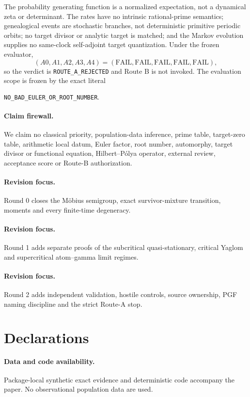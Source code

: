 \documentclass[9pt]{extarticle}
\begin{document}
The probability generating function is a normalized expectation, not a
dynamical zeta or determinant.  The rates have no intrinsic rational-prime
semantics; genealogical events are stochastic branches, not deterministic
primitive periodic orbits; no target divisor or analytic target is matched;
and the Markov evolution supplies no same-clock self-adjoint target
quantization.  Under the frozen evaluator,
\[
 (A0,A1,A2,A3,A4)=(\mathrm{FAIL},\mathrm{FAIL},\mathrm{FAIL},
 \mathrm{FAIL},\mathrm{FAIL}),
\]
so the verdict is \texttt{ROUTE\_A\_REJECTED} and Route B is not invoked.
The evaluation scope is frozen by the exact literal
\begin{center}
\texttt{NO\_BAD\_EULER\_OR\_ROOT\_NUMBER}.
\end{center}

\paragraph{Claim firewall.}
We claim no classical priority, population-data inference, prime table,
target-zero table, arithmetic local datum, Euler factor, root number,
automorphy, target divisor or functional equation, Hilbert--P\'olya operator,
external review, acceptance score or Route-B authorization.
\fi

\ifcase\CRevisionRound
\paragraph{Revision focus.} Round 0 closes the M\"obius semigroup, exact
survivor-mixture transition, moments and every finite-time degeneracy.
\or
\paragraph{Revision focus.} Round 1 adds separate proofs of the subcritical
quasi-stationary, critical Yaglom and supercritical atom--gamma limit regimes.
\or
\paragraph{Revision focus.} Round 2 adds independent validation, hostile
controls, source ownership, PGF naming discipline and the strict Route-A stop.
\fi

\section*{Declarations}
\paragraph{Data and code availability.}
Package-local synthetic exact evidence and deterministic code accompany the
paper.  No observational population data are used.
\end{document}
